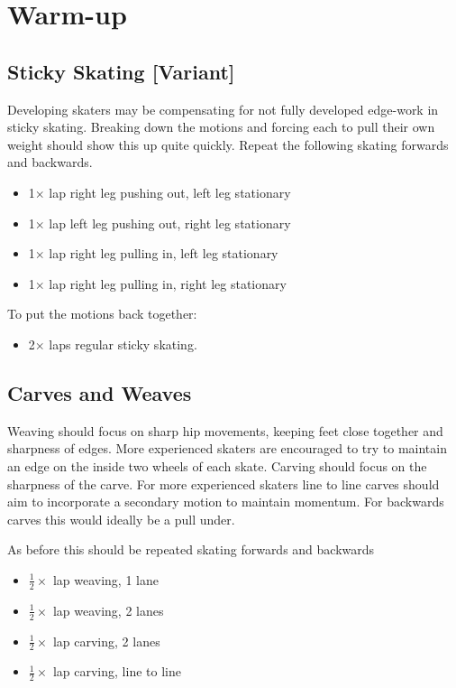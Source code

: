 \documentclass{journal}
\begin{document}
\pagebreak
\section*{Warm-up}
\label{sec:warmup}

\subsection*{Sticky Skating [Variant]}
\label{drill:warmup:sticky_one_foot}

Developing skaters may be compensating for not fully developed edge-work in sticky skating. Breaking down the motions and forcing each to pull their own weight should show this up quite quickly.  
Repeat the following skating forwards and backwards. 
\begin{itemize}
    \item 1$\times$ lap right leg pushing out, left leg stationary  
    \item 1$\times$ lap left leg pushing out, right leg stationary 
    \item 1$\times$ lap right leg pulling in, left leg stationary 
    \item 1$\times$ lap right leg pulling in, right leg stationary 
\end{itemize}

To put the motions back together:
\begin{itemize}
    \item 2$\times$ laps regular sticky skating. 
\end{itemize}


\subsection*{Carves and Weaves}
\label{drill:warmup:carves_and_weaves}
Weaving should focus on sharp hip movements, keeping feet close together and sharpness of edges. More experienced skaters are encouraged to try to maintain an edge on the inside two wheels of each skate.     
Carving should focus on the sharpness of the carve.
For more experienced skaters line to line carves should aim to incorporate a secondary motion to maintain momentum. For backwards carves this would ideally be a pull under.    

As before this should be repeated skating forwards and backwards
\begin{itemize}
    \item $\frac{1}{2}\times$ lap weaving, 1 lane 
    \item $\frac{1}{2}\times$ lap weaving, 2 lanes
    \item $\frac{1}{2}\times$ lap carving, 2 lanes 
    \item $\frac{1}{2}\times$ lap carving, line to line
\end{itemize}
\end{document}
